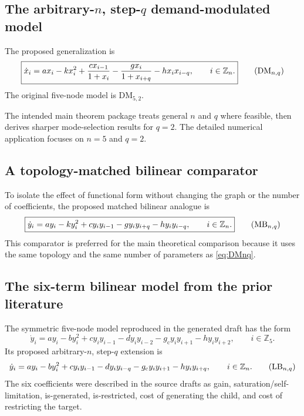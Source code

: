 \documentclass[11pt, reqno]{amsart}
\theoremstyle{definition}
\theoremstyle{remark}
\newcommand{\Z}{\mathbb{Z}}
\newcommand{\DM}{\mathrm{DM}}
\newcommand{\MB}{\mathrm{MB}}
\newcommand{\LB}{\mathrm{LB}}
\begin{document}
\subsection{The arbitrary-$n$, step-$q$ demand-modulated model}

The proposed generalization is
\begin{equation}
\label{eq:DMnq}
\boxed{
\dot x_i
=
 a x_i-kx_i^2
 +\frac{c x_{i-1}}{1+x_i}
 -\frac{g x_i}{1+x_{i+q}}
 -h x_i x_{i-q},
 \qquad i\in\Z_n.
}
\tag{$\DM_{n,q}$}
\end{equation}
The original five-node model is $\DM_{5,2}$.

The intended main theorem package treats general $n$ and $q$ where feasible,
then derives sharper mode-selection results for $q=2$.  The detailed numerical
application focuses on $n=5$ and $q=2$.

\subsection{A topology-matched bilinear comparator}

To isolate the effect of functional form without changing the graph or the
number of coefficients, the proposed matched bilinear analogue is
\begin{equation}
\label{eq:MBnq}
\boxed{
\dot y_i
=
 a y_i-k y_i^2
 +c y_i y_{i-1}
 -g y_i y_{i+q}
 -h y_i y_{i-q},
 \qquad i\in\Z_n.
}
\tag{$\MB_{n,q}$}
\end{equation}
This comparator is preferred for the main theoretical comparison because it
uses the same topology and the same number of parameters as
\eqref{eq:DMnq}.

\subsection{The six-term bilinear model from the prior literature}

The symmetric five-node model reproduced in the generated draft has the form
\begin{equation}
\label{eq:LB-five}
\dot y_i
=
 a y_i-b y_i^2
 +c y_i y_{i-1}
 -d y_i y_{i-2}
 -g_{\mathrm c} y_i y_{i+1}
 -h y_i y_{i+2},
 \qquad i\in\Z_5.
\end{equation}
Its proposed arbitrary-$n$, step-$q$ extension is
\begin{equation}
\label{eq:LBnq}
\dot y_i
=
 a y_i-b y_i^2
 +c y_i y_{i-1}
 -d y_i y_{i-q}
 -g_{\mathrm c} y_i y_{i+1}
 -h y_i y_{i+q},
 \qquad i\in\Z_n.
\tag{$\LB_{n,q}$}
\end{equation}
The six coefficients were described in the source drafts as gain,
saturation/self-limitation, is-generated, is-restricted, cost of generating the
child, and cost of restricting the target.
\end{document}
